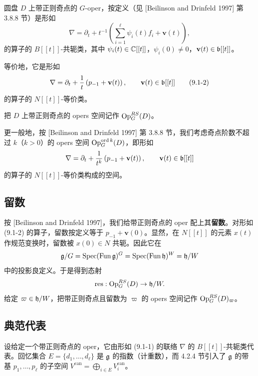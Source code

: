 圆盘 $D$ 上带正则奇点的 $G$-oper，按定义（见 [Beilinson and Drinfeld 1997] 第 3.8.8 节）是形如
\begin{equation}
\nabla = \partial_t + t^{-1}\left(\sum_{i=1}^{\ell}\psi_i(t)f_i + \mathbf{v}(t)\right),
\tag{9.1-1}
\end{equation}
的算子的 $B[[t]]$-共轭类，其中 $\psi_i(t)\in\mathbb{C}[[t]]$，$\psi_i(0)\ne 0$，$\mathbf{v}(t)\in\mathfrak{b}[[t]]$。

等价地，它是形如
\begin{equation}
\nabla = \partial_t + \frac{1}{t}\left(p_{-1} + \mathbf{v}(t)\right),\qquad \mathbf{v}(t)\in\mathfrak{b}[[t]]
\tag{9.1-2}
\end{equation}
的算子的 $N[[t]]$-等价类。

把 $D$ 上带正则奇点的 opers 空间记作 $\operatorname{Op}^{RS}_G(D)$。

更一般地，按 [Beilinson and Drinfeld 1997] 第 3.8.8 节，我们考虑奇点阶数不超过 $k$（$k>0$）的 opers 空间 $\operatorname{Op}^{\mathrm{ord}\,k}_G(D)$，即形如
\[
\nabla = \partial_t + \frac{1}{t^k}\left(p_{-1} + \mathbf{v}(t)\right),\qquad \mathbf{v}(t)\in\mathfrak{b}[[t]]
\]
的算子的 $N[[t]]$-等价类构成的空间。

\subsection{留数}

按 [Beilinson and Drinfeld 1997]，我们给带正则奇点的 oper 配上其\textbf{留数}。对形如 (9.1-2) 的算子，留数按定义等于 $p_{-1}+\mathbf{v}(0)$。显然，在 $N[[t]]$ 的元素 $x(t)$ 作规范变换时，留数被 $x(0)\in N$ 共轭。因此它在
\[
\mathfrak{g}/G = \operatorname{Spec}(\operatorname{Fun}\mathfrak{g})^G = \operatorname{Spec}(\operatorname{Fun}\mathfrak{h})^W = \mathfrak{h}/W
\]
中的投影良定义。于是得到态射
\[
\operatorname{res}: \operatorname{Op}^{RS}_G(D)\to \mathfrak{h}/W.
\]
给定 $\varpi\in\mathfrak{h}/W$，把带正则奇点且留数为 $\varpi$ 的 opers 空间记作 $\operatorname{Op}^{RS}_G(D)_\varpi$。

\subsection{典范代表}

设给定一个带正则奇点的 oper，它由形如 (9.1-1) 的联络 $\nabla$ 的 $B[[t]]$-共轭类代表。回忆集合 $E=\{d_1,\dots,d_\ell\}$ 是 $\mathfrak{g}$ 的指数（计重数），而 4.2.4 节引入了 $\mathfrak{g}$ 的带基 $p_1,\dots,p_\ell$ 的子空间 $V^{\mathrm{can}} = \bigoplus_{i\in E}V^{\mathrm{can}}_i$。

